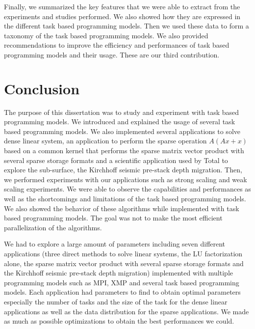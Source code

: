 Finally, we summarized the key features that we were able to extract from the experiments and studies performed.
We also showed how they are expressed in the different task based programming models.
Then we used these data to form a taxonomy of the task based programming models.
We also provided recommendations to improve the efficiency and performances of task based programming models and their usage.
These are our third contribution.

\section{Conclusion}
The purpose of this dissertation was to study and experiment with task based programming models.
We introduced and explained the usage of several task based programming models.
We also implemented several applications to solve dense linear system, an application to perform the sparse operation $A(Ax+x)$ based on a common kernel that performs the sparse matrix vector product with several sparse storage formats and a scientific application used by Total to explore the sub-surface, the Kirchhoff seismic pre-stack depth migration.
Then, we performed experiments with our applications such as strong scaling and weak scaling experiments.
We were able to observe the capabilities and performances as well as the shortcomings and limitations of the task based programming models.
We also showed the behavior of these algorithms while implemented with task based programming models.
The goal was not to make the most efficient parallelization of the algorithms.

We had to explore a large amount of parameters including seven different applications (three direct methods to solve linear systems, the LU factorization alone, the sparse matrix vector product with several sparse storage formats and the Kirchhoff seismic pre-stack depth migration) implemented with multiple programming models such as MPI, XMP and several task based programming models.
Each application had parameters to find to obtain optimal parameters especially the number of tasks and the size of the task for the dense linear applications as well as the data distribution for the sparse applications.
We made as much as possible optimizations to obtain the best performances we could.

